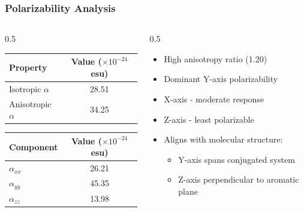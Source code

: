 \documentclass[aspectratio=169, 9pt]{beamer}
\begin{document}
\begin{frame}
\frametitle{Polarizability Analysis}
\begin{columns}
\begin{column}{0.5\textwidth}
\begin{center}
\begin{tabular}{|l|c|}
\hline
\textbf{Property} & \textbf{Value ($\times 10^{-24}$ esu)} \\
\hline
Isotropic $\alpha$ & 28.51 \\
\hline
Anisotropic $\alpha$ & 34.25 \\
\hline
\end{tabular}

\vspace{0.5cm}

\begin{tabular}{|l|c|}
\hline
\textbf{Component} & \textbf{Value ($\times 10^{-24}$ esu)} \\
\hline
$\alpha_{xx}$ & 26.21 \\
\hline
$\alpha_{yy}$ & 45.35 \\
\hline
$\alpha_{zz}$ & 13.98 \\
\hline
\end{tabular}
\end{center}
\end{column}
\begin{column}{0.5\textwidth}
\begin{itemize}
\item High anisotropy ratio (1.20)
\item Dominant Y-axis polarizability
\item X-axis - moderate response
\item Z-axis - least polarizable
\item Aligns with molecular structure:
  \begin{itemize}
  \item Y-axis spans conjugated system
  \item Z-axis perpendicular to aromatic plane
  \end{itemize}
\end{itemize}
\end{column}
\end{columns}
\end{frame}
\end{document}
